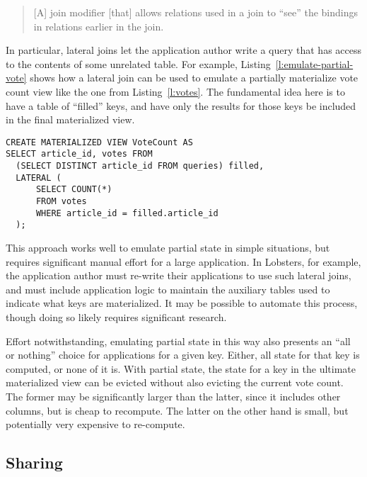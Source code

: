 \begin{quote}
  [A] join modifier [that] allows relations used in a join to ``see'' the
  bindings in relations earlier in the join.
\end{quote}

In particular, lateral joins let the application author write a query that has
access to the contents of some unrelated table. For example,
Listing~\ref{l:emulate-partial-vote} shows how a lateral join can be used to
emulate a partially materialize vote count view like the one from
Listing~\ref{l:votes}. The fundamental idea here is to have a table of
``filled'' keys, and have only the results for those keys be included in the
final materialized view.

\begin{listing}[h]
  \begin{verbatim}
CREATE MATERIALIZED VIEW VoteCount AS
SELECT article_id, votes FROM
  (SELECT DISTINCT article_id FROM queries) filled,
  LATERAL (
      SELECT COUNT(*)
      FROM votes
      WHERE article_id = filled.article_id
  );
  \end{verbatim}
  \caption{Using a lateral join to emulate partial state in vote.}
  \label{l:emulate-partial-vote}
\end{listing}

This approach works well to emulate partial state in simple situations, but
requires significant manual effort for a large application. In Lobsters, for
example, the application author must re-write their applications to use such
lateral joins, and must include application logic to maintain the auxiliary
tables used to indicate what keys are materialized. It may be possible to
automate this process, though doing so likely requires significant research.

Effort notwithstanding, emulating partial state in this way also presents an
``all or nothing'' choice for applications for a given key. Either, all state
for that key is computed, or none of it is. With partial state, the state for a
key in the ultimate materialized view can be evicted without also evicting the
current vote count. The former may be significantly larger than the latter,
since it includes other columns, but is cheap to recompute. The latter on the
other hand is small, but potentially very expensive to re-compute.

\subsection{Sharing}

